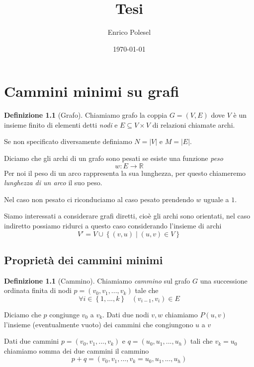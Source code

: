 \documentclass[a4paper,10pt]{amsbook}
\title{Tesi}
\author{Enrico Polesel}
\date{\today}
\newcounter{counter1}
\theoremstyle{plain}
\theoremstyle{definition}
\newtheorem{mydef}[counter1]{Definizione}
\theoremstyle{remark}
\newcommand{\set}[1]{\left\{#1\right\}}
\newcommand{\abs}[1]{\left|#1\right|}
\begin{document}
\maketitle


\setcounter{tocdepth}{5}



\tableofcontents

\chapter{Cammini minimi su grafi}

\begin{mydef}[Grafo]
  Chiamiamo grafo la coppia $G = (V,E)$ dove $V$ è un insieme finito
  di elementi detti \textit{nodi} e $E\subseteq V \times V$ di
  relazioni chiamate archi.
\end{mydef}

Se non specificato diversamente definiamo $N = \abs{V}$ e $M =
\abs{E}$.

Diciamo che gli archi di un grafo sono pesati se esiste una funzione
\textit{peso}
\[ w : E \rightarrow \mathbb{R} \]
Per noi il peso di un arco rappresenta la sua lunghezza, per questo
chiameremo \textit{lunghezza di un arco} il suo peso.

Nel caso non pesato ci riconduciamo al caso pesato prendendo $w$
uguale a $1$.

Siamo interessati a considerare grafi diretti, cioè gli archi sono
orientati, nel caso indiretto possiamo ridurci a questo caso
considerando l'insieme di archi 
\[ V' = V \cup \set{ (v,u) \mid (u,v) \in V } \]

\section{Proprietà dei cammini minimi}

\begin{mydef}[Cammino]
  Chiamiamo \textit{cammino} sul grafo $G$ una successione ordinata
  finita di nodi $p = ( v_0, v_1, ..., v_k)$ tale che 
  \[ \forall i \in \set{ 1, ... , k} \;\;\; (v_{i-1}, v_{i} ) \in E\]
\end{mydef}

Diciamo che $p$ congiunge $v_0$ a $v_k$. Dati due nodi $v,w$ chiamiamo
$P(u,v)$ l'insieme (eventualmente vuoto) dei cammini che congiungono
$u$ a $v$

Dati due cammini $p = ( v_0, v_1, ..., v_k)$ e $q = ( u_0, u_1, ...,
u_{h})$ tali che $v_k = u_0$ chiamiamo somma dei due cammini il
cammino
\[ p+q = ( v_0, v_1, ..., v_k= u_0, u_1, ..., u_{h}) \]
\end{document}
